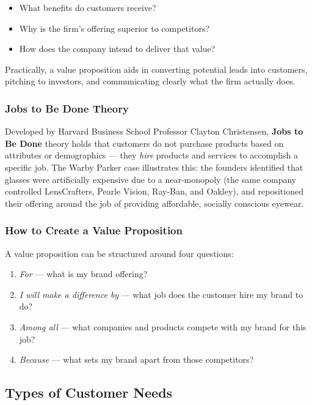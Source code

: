 \begin{itemize}
    \item What benefits do customers receive?
    \item Why is the firm's offering superior to competitors?
    \item How does the company intend to deliver that value?
\end{itemize}

Practically, a value proposition aids in converting potential leads into customers, 
pitching to investors, and communicating clearly what the firm actually does.

\subsubsection*{Jobs to Be Done Theory}

Developed by Harvard Business School Professor Clayton Christensen, \textbf{Jobs to Be 
Done} theory holds that customers do not purchase products based on attributes or 
demographics --- they \textit{hire} products and services to accomplish a specific job. 
The Warby Parker case illustrates this: the founders identified that glasses were 
artificially expensive due to a near-monopoly (the same company controlled LensCrafters, 
Pearle Vision, Ray-Ban, and Oakley), and repositioned their offering around the job of 
providing affordable, socially conscious eyewear.

\subsubsection*{How to Create a Value Proposition}

A value proposition can be structured around four questions:

\begin{enumerate}
    \item \textit{For} --- what is my brand offering?
    \item \textit{I will make a difference by} --- what job does the customer hire my 
    brand to do?
    \item \textit{Among all} --- what companies and products compete with my brand for 
    this job?
    \item \textit{Because} --- what sets my brand apart from those competitors?
\end{enumerate}

\subsection*{Types of Customer Needs}

